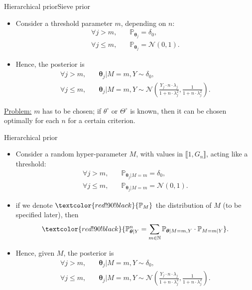 \documentclass[10pt]{beamer}
\begin{document}
\begin{frame}{Hierarchical prior}{Sieve prior}
\begin{itemize}
\item Consider a \textcolor{red!90!black}{threshold parameter} $m$, depending on $n$:
\begin{align*}
\forall j > m ,& \quad \mathbb{P}_{\boldsymbol{\theta}_{j}} = \delta_{0},\\
\forall j \leq m ,& \quad \mathbb{P}_{\boldsymbol{\theta}_{j}} = \mathcal{N}\left(0, 1\right).
\end{align*}
\item Hence, the posterior is
\begin{align*}
\forall j > m, &\quad \boldsymbol{\theta}_{j} \vert M = m, Y \sim \delta_{0},\\
\forall j \leq m, &\quad \boldsymbol{\theta}_{j} \vert M = m, Y \sim \mathcal{N}\left(\frac{Y_{j} \cdot n \cdot \lambda_{j}}{1 + n \cdot \lambda_{j}^{2}}, \frac{1}{1 + n \cdot \lambda_{j}^{2}} \right).
\end{align*}
\end{itemize}

\underline{Problem:} $m$ has to be chosen; if $\theta^{\circ}$ or $\Theta^{\circ}$ is known, then it can be chosen optimally for each $n$ for a certain criterion.

\end{frame}

\begin{frame}{Hierarchical prior}
\begin{itemize}
\item Consider a \textcolor{red!90!black}{random hyper-parameter} \textcolor{red!90!black}{$M$}, with values in $\llbracket 1, G_{n} \rrbracket$, acting like a threshold:
\begin{align*}
\forall j > m ,& \quad \mathbb{P}_{\boldsymbol{\theta}_{j}\vert M = m} = \delta_{0},\\
\forall j \leq m ,& \quad \mathbb{P}_{\boldsymbol{\theta}_{j}\vert M = m} = \mathcal{N}\left(0, 1\right).
\end{align*}
\item if we denote $\textcolor{red!90!black}{\mathbb{P}_{M}}$ the distribution of $M$ (to be specified later), then
\[\textcolor{red!90!black}{\mathbb{P}_{\boldsymbol{\theta} \vert Y}^{n} = \sum\limits_{m \in \mathbb{N}} \mathbb{P}_{\boldsymbol{\theta} \vert M = m, Y} \cdot \mathbb{P}_{M = m \vert Y}} .\]
\item Hence, given $M$, the posterior is
\begin{align*}
\forall j > m, &\quad \boldsymbol{\theta}_{j} \vert M = m, Y \sim \delta_{0},\\
\forall j \leq m, &\quad \boldsymbol{\theta}_{j} \vert M = m, Y \sim \mathcal{N}\left(\frac{Y_{j} \cdot n \cdot \lambda_{j}}{1 + n \cdot \lambda_{j}^{2}}, \frac{1}{1 + n \cdot \lambda_{j}^{2}} \right).
\end{align*}
\end{itemize}
\end{frame}
\end{document}
